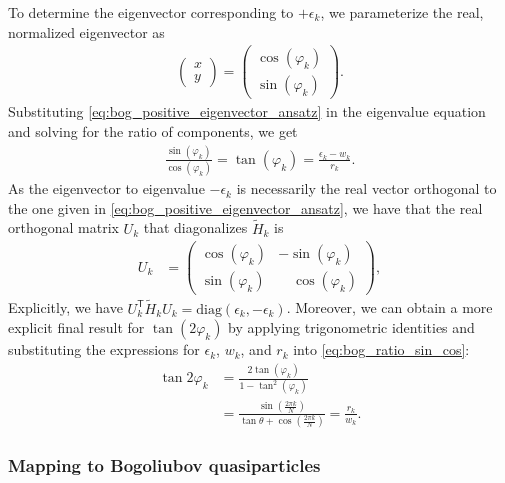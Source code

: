 To determine the eigenvector corresponding to $+\epsilon_k$, we parameterize the real, normalized eigenvector as
\begin{align}
    \begin{pmatrix}
        x\\
        y
    \end{pmatrix} = \begin{pmatrix}
                        \cos(\varphi_k)\\
                        \sin(\varphi_k)
                    \end{pmatrix}.
    \label{eq:bog_positive_eigenvector_ansatz}
\end{align}
Substituting \cref{eq:bog_positive_eigenvector_ansatz} in the eigenvalue equation and solving for the ratio of components, we get
\begin{align}
    \frac{\sin(\varphi_k)}{\cos(\varphi_k)} = \tan(\varphi_k) = \frac{\epsilon_k - w_k}{r_k}.
    \label{eq:bog_ratio_sin_cos}
\end{align}
As the eigenvector to eigenvalue $-\epsilon_k$ is necessarily the real vector orthogonal to the one given in \cref{eq:bog_positive_eigenvector_ansatz}, we have that the real orthogonal matrix $U_k$ that diagonalizes $\tilde{H}_k$ is
\begin{align}
    U_k &=
    \begin{pmatrix}
        \cos(\varphi_k) &- \sin(\varphi_k)\\
        \sin(\varphi_k) &\quad\cos(\varphi_k)
    \end{pmatrix},
    \label{eq:bog_Uk_matrix}
\end{align}
Explicitly, we have $U_k^\mathsf{T} \tilde{H}_k U_k= \mbox{diag}(\epsilon_k, -\epsilon_k)$.
Moreover, we can obtain a more explicit final result for $\tan(2\varphi_k)$ by applying trigonometric identities and substituting the expressions for $\epsilon_k$, $w_k$, and $r_k$ into \cref{eq:bog_ratio_sin_cos}:
\begin{align}
    \tan2\varphi_k
     &=
    \frac{2 \tan(\varphi_k)}{1 - \tan^2(\varphi_k)}\nonumber\\
     &=
    \frac{\sin(\frac{2\pi k}{N})}{\tan\theta +\cos(\frac{2\pi k}{N})} = \frac{r_k}{w_k}.
    \label{eq:bog_tan_phi_k_final}
\end{align}


\subsubsection{Mapping to Bogoliubov quasiparticles}

